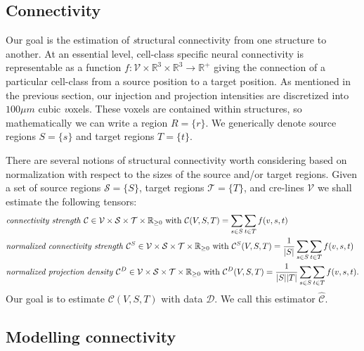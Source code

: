 \subsection{Connectivity}

Our goal is the estimation of {\textit structural connectivity} from one structure to another.
At an essential level, cell-class specific neural connectivity is representable as a function $f:  \mathcal V \times \mathbb R^3 \times \mathbb R^3 \to \mathbb R^+$ giving the connection of a particular cell-class from a source position to a target position.
As mentioned in the previous section, our injection and projection intensities are discretized into $100 \mu m$ cubic {\textit voxels}. %
These voxels are contained within structures, so mathematically we can write a region $R= \{r \}$.
We generically denote source regions $S = \{s\}$ and target regions $T = \{t\}$.

There are several notions of structural connectivity worth considering based on normalization with respect to the sizes of the source and/or target regions.
Given a set of source regions $\mathcal S = \{ S\} $, target regions $\mathcal T = \{ T \}$, and cre-lines $\mathcal V$ we shall estimate the following tensors:
\begin{align*}
&\text{\textit {connectivity strength} } \mathcal C \in \mathcal V \times \mathcal S \times \mathcal T \times \mathbb R_{\geq 0}  \text{ with } \mathcal C(V,S,T) = \sum_{s \in S} \sum_{t \in  T} f(v,s,t) \\
&\text{\textit {normalized connectivity strength} } \mathcal C^S \in \mathcal V \times \mathcal S \times \mathcal T \times \mathbb R_{\geq 0}  \text{ with } \mathcal C^S(V,S,T) = \frac{1}{|S|} \sum_{s \in  S} \sum_{t \in  T} f(v,s,t) \\
&\text{\textit {normalized projection density} } \mathcal C^D \in \mathcal V \times \mathcal S \times \mathcal T \times \mathbb R_{\geq 0} \text{ with } \mathcal C^D(V,S,T) = \frac{1}{| S | | T|} \sum_{s \in S} \sum_{t \in T} f(v,s,t).
\end{align*}
Our goal is to estimate $\mathcal C (V,S,T)$ with data $\mathcal D$.
We call this estimator $\widehat { \mathcal C } $.

\subsection{Modelling connectivity}

